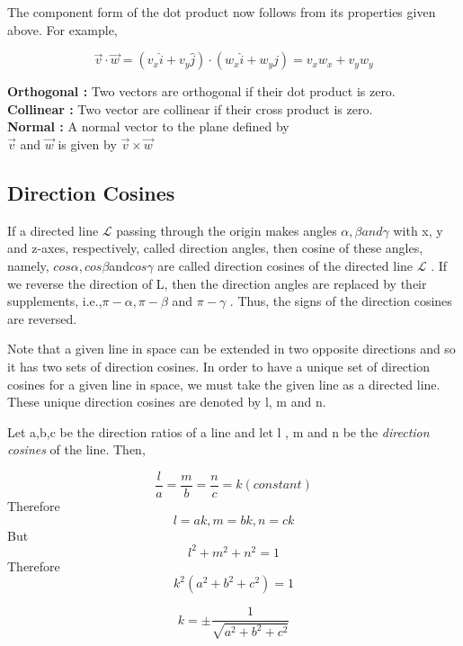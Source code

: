 \documentclass[12pt]{report}
\begin{document}
The component form of the dot product now follows from its properties given above. For example, 

\[ \overrightarrow{v} \cdot \overrightarrow{w} = ( v_{x} \widehat{i} + v_{y} \widehat{j}) \cdot ( w_{x} \widehat{i} + w_{y} \widehat{j}) = v_{x}w_{x} + v_{y}w_{y} \] 

\indent \textbf{Orthogonal : } Two vectors are orthogonal if their dot product is zero.  \\
\indent \textbf{Collinear : } Two vector are collinear if their cross product is zero.  \\
\indent \textbf{Normal : } A normal vector to the plane defined by\\
$\overrightarrow{v}  $ and $ \overrightarrow{w}$ is given by  $\overrightarrow{v} \times \overrightarrow{w}  $

\subsection{Direction Cosines}


If a directed line $\mathcal{L}$ passing through the origin makes angles $\alpha, \beta and \gamma$ with x, y and z-axes, respectively, called direction angles, then cosine of these angles, namely, $cos \alpha, cos \beta $and$ cos \gamma$ are called direction cosines of the directed line $\mathcal{L}$ . If we reverse the direction of L, then the direction angles are replaced by their supplements, i.e.,$ \pi - \alpha , \pi - \beta$ and $\pi - \gamma$ . Thus, the signs of the direction cosines are reversed. 

\vspace{0.3cm}
Note that a given line in space can be extended in two opposite directions and so it has two sets of direction cosines. In order to have a unique set of direction cosines for a given line in space, we must take the given line as a directed line. These unique direction cosines are denoted by l, m and n. \\
\vspace{0.5cm}

Let a,b,c be the direction ratios of a line and let l , m and n be the  \textit{direction cosines} of the line. Then,

\[ \dfrac{l}{a} = \dfrac{m}{b} = \dfrac{n}{c} = k (constant) \]
Therefore \[ l = ak, m = bk , n = ck \]
But       \[ l^2 + m^2 + n^2 = 1 \]
Therefore \[ k^2 (a^2 + b^2 + c^2) = 1 \]

\[ k = \pm \dfrac{1}{ \sqrt{a^2 + b^2 + c^2} } \]
\end{document}
